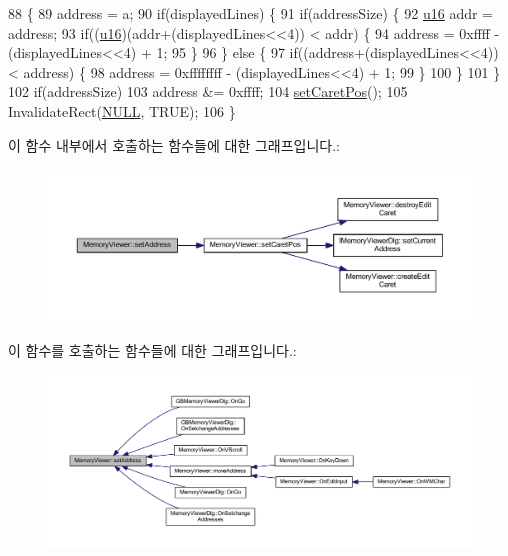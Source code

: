 \begin{DoxyCode}
88 \{
89   address = a;
90   \textcolor{keywordflow}{if}(displayedLines) \{
91     \textcolor{keywordflow}{if}(addressSize) \{
92       \mbox{\hyperlink{_system_8h_a9e6c91d77e24643b888dbd1a1a590054}{u16}} addr = address;
93       \textcolor{keywordflow}{if}((\mbox{\hyperlink{_system_8h_a9e6c91d77e24643b888dbd1a1a590054}{u16}})(addr+(displayedLines<<4)) < addr) \{
94         address = 0xffff - (displayedLines<<4) + 1;
95       \}      
96     \} \textcolor{keywordflow}{else} \{
97       \textcolor{keywordflow}{if}((address+(displayedLines<<4)) < address) \{
98         address = 0xffffffff - (displayedLines<<4) + 1;
99       \}
100     \}
101   \}
102   \textcolor{keywordflow}{if}(addressSize)
103     address &= 0xffff;
104   \mbox{\hyperlink{class_memory_viewer_abfed49727a6de1b52e5495ed96816759}{setCaretPos}}();
105   InvalidateRect(\mbox{\hyperlink{getopt1_8c_a070d2ce7b6bb7e5c05602aa8c308d0c4}{NULL}}, TRUE);
106 \}
\end{DoxyCode}
이 함수 내부에서 호출하는 함수들에 대한 그래프입니다.\+:
\nopagebreak
\begin{figure}[H]
\begin{center}
\leavevmode
\includegraphics[width=350pt]{class_memory_viewer_abe391051455e116889da0613c19888a2_cgraph}
\end{center}
\end{figure}
이 함수를 호출하는 함수들에 대한 그래프입니다.\+:
\nopagebreak
\begin{figure}[H]
\begin{center}
\leavevmode
\includegraphics[width=350pt]{class_memory_viewer_abe391051455e116889da0613c19888a2_icgraph}
\end{center}
\end{figure}
\mbox{\label{class_memory_viewer_a64938573e15f4d5b31eea26dc6788d0e}} 
